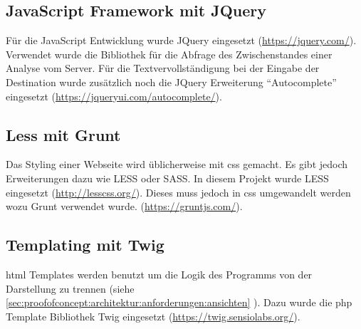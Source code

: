 \subsection{JavaScript Framework mit JQuery}
Für die JavaScript Entwicklung wurde JQuery eingesetzt (\url{https://jquery.com/}). Verwendet wurde die Bibliothek für die Abfrage des Zwischenstandes einer Analyse vom Server. Für die Textvervollständigung bei der Eingabe der Destination wurde zusätzlich noch die JQuery Erweiterung "`Autocomplete"' eingesetzt (\url{https://jqueryui.com/autocomplete/}).

\subsection{Less mit Grunt}
Das Styling einer Webseite wird üblicherweise mit \gls{css} gemacht. Es gibt jedoch Erweiterungen dazu wie LESS oder SASS. In diesem Projekt wurde LESS eingesetzt (\url{http://lesscss.org/}). Dieses muss jedoch in \gls{css} umgewandelt werden wozu Grunt verwendet wurde. (\url{https://gruntjs.com/}).

\subsection{Templating mit Twig}
\label{sec:proofofconcept:externebibliotheken:twig}
\gls{html} Templates werden benutzt um die Logik des Programms von der Darstellung zu trennen (siehe \cref{sec:proofofconcept:architektur:anforderungen:ansichten} ). Dazu wurde die \gls{php} Template Bibliothek Twig eingesetzt (\url{https://twig.sensiolabs.org/}).

